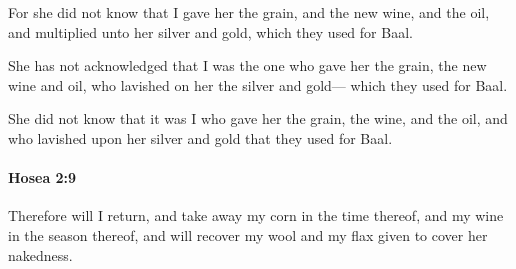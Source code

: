 			\begin{versebox}
					\item[BHS] 
					\item[LXX] 
					\item[ASV] For she did not know that I gave her the grain, and the new wine, and the oil, and multiplied unto her silver and gold, which they used for Baal.
					\item[NIV] She has not acknowledged that I was the one who gave her the grain, the new wine and oil, who lavished on her the silver and gold— which they used for Baal.
					\item[NRSV] She did not know that it was I who gave her the grain, the wine, and the oil, and who lavished upon her silver and gold that they used for Baal.
			\end{versebox}

		\paragraph{Hosea 2:9} %
			\label{HOSEA-2-9}

			Therefore will I return, and take away my corn in the time thereof, and my wine in the season thereof, and will recover my wool and my flax given to cover her nakedness.

